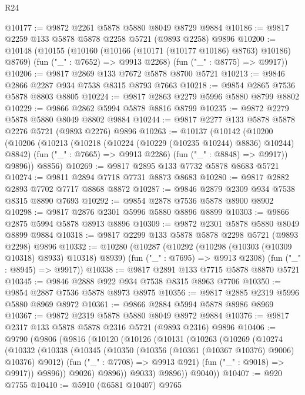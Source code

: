 \begin{lexlean}{R24}
\begin{coremodule}
@10177 := @9872 @2261 @5878 @5880 @8049 @8729 @9884
@10186 := @9817 @2259 @133 @5878 @5878 @2258 @5721 (@9893 @2258) @9896
@10200 := @10148
    (@10155
      (@10160 (@10166 (@10171 (@10177 @10186) @8763) @10186) @8769)
      (fun ("_" : @7652) => @9913 @2268)
      (fun ("_" : @8775) => @9917))
@10206 := @9817 @2869 @133 @7672 @5878 @8700 @5721
@10213 := @9846 @2866 @2287 @934 @7538 @8315 @8793 @7663
@10218 := @9854 @2865 @7536 @5878 @8803 @8805
@10224 := @9817 @2863 @2279 @5996 @5880 @8799 @8802
@10229 := @9866 @2862 @5994 @5878 @8816 @8799
@10235 := @9872 @2279 @5878 @5880 @8049 @8802 @9884
@10244 := @9817 @2277 @133 @5878 @5878 @2276 @5721 (@9893 @2276) @9896
@10263 := @10137
    (@10142
      (@10200
        (@10206
          (@10213
            (@10218 (@10224 (@10229 (@10235 @10244) @8836) @10244) @8842)
            (fun ("_" : @7665) => @9913 @2286)
            (fun ("_" : @8848) => @9917))
          @9896))
      @8856)
@10269 := @9817 @2895 @133 @7732 @5878 @8683 @5721
@10274 := @9811 @2894 @7718 @7731 @8873 @8683
@10280 := @9817 @2882 @2893 @7702 @7717 @8868 @8872
@10287 := @9846 @2879 @2309 @934 @7538 @8315 @8890 @7693
@10292 := @9854 @2878 @7536 @5878 @8900 @8902
@10298 := @9817 @2876 @2301 @5996 @5880 @8896 @8899
@10303 := @9866 @2875 @5994 @5878 @8913 @8896
@10309 := @9872 @2301 @5878 @5880 @8049 @8899 @9884
@10318 := @9817 @2299 @133 @5878 @5878 @2298 @5721 (@9893 @2298) @9896
@10332 := @10280
    (@10287
      (@10292 (@10298 (@10303 (@10309 @10318) @8933) @10318) @8939)
      (fun ("_" : @7695) => @9913 @2308)
      (fun ("_" : @8945) => @9917))
@10338 := @9817 @2891 @133 @7715 @5878 @8870 @5721
@10345 := @9846 @2888 @922 @934 @7538 @8315 @8963 @7706
@10350 := @9854 @2887 @7536 @5878 @8973 @8975
@10356 := @9817 @2885 @2319 @5996 @5880 @8969 @8972
@10361 := @9866 @2884 @5994 @5878 @8986 @8969
@10367 := @9872 @2319 @5878 @5880 @8049 @8972 @9884
@10376 := @9817 @2317 @133 @5878 @5878 @2316 @5721 (@9893 @2316) @9896
@10406 := @9790
    (@9806
      (@9816
        (@10120
          (@10126
            (@10131
              (@10263
                (@10269
                  (@10274
                    (@10332
                      (@10338
                        (@10345
                          (@10350 (@10356 (@10361 (@10367 @10376) @9006) @10376) @9012)
                          (fun ("_" : @7708) => @9913 @921)
                          (fun ("_" : @9018) => @9917))
                        @9896))
                    @9026)
                  @9896))
              @9033)
            @9896))
        @9040))
@10407 := @920 @7755
@10410 := @5910 (@6581 @10407) @9765

\end{coremodule}
\end{lexlean}
